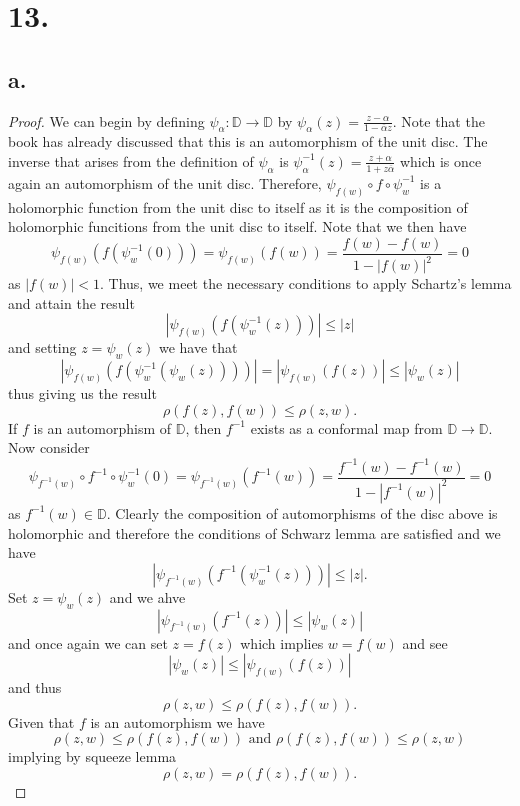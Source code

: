 \documentclass{article}
\begin{document}
\section*{13.}
\subsection*{a.}
\begin{proof}
  We can begin by defining $\psi_{\alpha}: \mathbb{D} \to \mathbb{D}$ by $\psi_{\alpha}(z) = \frac{z - \alpha}{1 - \overline{\alpha}z}$. Note that the book has already discussed that this is an automorphism of the unit disc. The inverse that arises from the definition of $\psi_{\alpha}$ is $\psi_{\alpha}^{-1}(z) = \frac{z + \alpha}{1 + z\overline{\alpha}}$ which is once again an automorphism of the unit disc. Therefore, $\psi_{f(w)}\circ f \circ \psi_{w}^{-1}$ is a holomorphic function from the unit disc to itself as it is the composition of holomorphic funcitions from the unit disc to itself. Note that we then have 
  \[
  \psi_{f(w)}(f(\psi_w^{-1}(0)))  = \psi_{f(w)}(f(w)) = \frac{f(w) - f(w)}{1 - |f(w)|^2} = 0 
  \]
  as $|f(w)| < 1$. Thus, we meet the necessary conditions to apply Schartz's lemma and attain the result
  \[
  |\psi_{f(w)}(f(\psi_w^{-1}(z)))| \leq |z|  
  \]
  and setting $z = \psi_w(z)$ we have that 
  \[
    |\psi_{f(w)}(f(\psi_w^{-1}(\psi_w(z))))| = |\psi_{f(w)}(f(z))| \leq |\psi_w(z)|
  \]
  thus giving us the result
  \[
   \rho(f(z), f(w)) \leq \rho(z, w). 
  \]
  If $f$ is an automorphism of $\mathbb{D}$, then $f^{-1}$ exists as a conformal map from $\mathbb{D} \to \mathbb{D}$. Now consider 
  \[
    \psi_{f^{-1}(w)}\circ f^{-1}\circ \psi_w^{-1}(0) = \psi_{f^{-1}(w)}(f^{-1}(w)) = \frac{f^{-1}(w) - f^{-1}(w)}{1 - |f^{-1}(w)|^2} = 0
  \]
  as $f^{-1}(w) \in \mathbb{D}$. Clearly the composition of automorphisms of the disc above is holomorphic and therefore the conditions of Schwarz lemma are satisfied and we have 
  \[
  |\psi_{f^{-1}(w)}(f^{-1}(\psi_{w}^{-1}(z)))| \leq |z|.
  \]
  Set $z = \psi_w(z)$ and we ahve 
  \[
  |\psi_{f^{-1}(w)}(f^{-1}(z))| \leq |\psi_w(z)|  
  \]
  and once again we can set $z = f(z)$ which implies $w = f(w)$ and see 
  \[
  |\psi_w(z)| \leq |\psi_{f(w)}(f(z))|  
  \]
  and thus 
  \[
  \rho(z, w) \leq \rho(f(z), f(w)).   
  \]
  Given that $f$ is an automorphism we have 
  \[
    \rho(z, w) \leq \rho(f(z), f(w)) \text{ and } \rho(f(z), f(w)) \leq \rho(z, w)
  \]
  implying by squeeze lemma 
  \[
  \rho(z, w) = \rho(f(z), f(w)).  
  \]
\end{proof}
\end{document}
